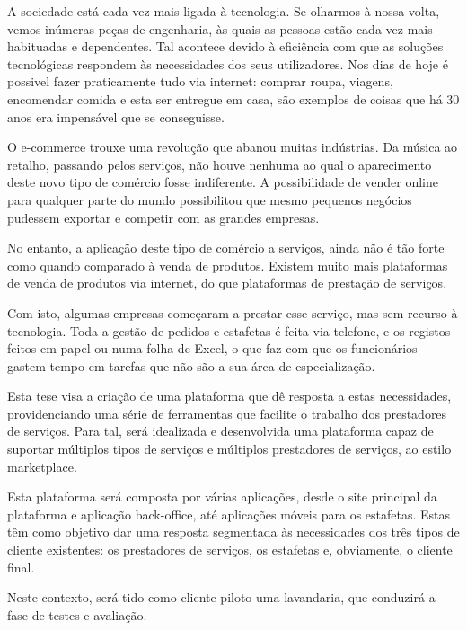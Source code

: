 \begin{abstractotherlanguage}
A sociedade está cada vez mais ligada à tecnologia. Se olharmos à nossa volta, vemos inúmeras peças de engenharia, às quais as pessoas estão cada vez mais habituadas e dependentes. Tal acontece devido à eficiência com que as soluções tecnológicas respondem às necessidades dos seus utilizadores. Nos dias de hoje é possivel fazer praticamente tudo via internet: comprar roupa, viagens, encomendar comida e esta ser entregue em casa, são exemplos de coisas que há 30 anos era impensável que se conseguisse.
\par
O e-commerce trouxe uma revolução que abanou muitas indústrias. Da música ao retalho, passando pelos serviços, não houve nenhuma ao qual o aparecimento deste novo tipo de comércio fosse indiferente. A possibilidade de vender online para qualquer parte do mundo possibilitou que mesmo pequenos negócios pudessem exportar e competir com as grandes empresas. 
\par
No entanto, a aplicação deste tipo de comércio a serviços, ainda não é tão forte como quando comparado à venda de produtos. Existem muito mais plataformas de venda de produtos via internet, do que plataformas de prestação de serviços.
\par
Com isto, algumas empresas começaram a prestar esse serviço, mas sem recurso à tecnologia. Toda a gestão de pedidos e estafetas é feita via telefone, e os registos feitos em papel ou numa folha de Excel, o que faz com que os funcionários gastem tempo em tarefas que não são a sua área de especialização.
\par
Esta tese visa a criação de uma plataforma que dê resposta a estas necessidades, providenciando uma série de ferramentas que facilite o trabalho dos prestadores de serviços. Para tal, será idealizada e desenvolvida uma plataforma capaz de suportar múltiplos tipos de serviços e múltiplos prestadores de serviços, ao estilo marketplace. 
\par
Esta plataforma será composta por várias aplicações, desde o site principal da plataforma e aplicação back-office, até aplicações móveis para os estafetas. Estas têm como objetivo dar uma resposta segmentada às necessidades dos três tipos de cliente existentes: os prestadores de serviços, os estafetas e, obviamente, o cliente final.

\par
Neste contexto, será tido como cliente piloto uma lavandaria, que conduzirá a fase de testes e avaliação.


\end{abstractotherlanguage}

